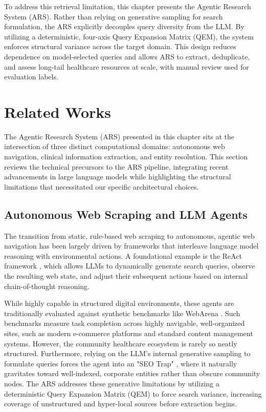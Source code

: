 \documentclass[12pt,oneside]{report}
\begin{document}
To address this retrieval limitation, this chapter presents the Agentic Research System (ARS). Rather than relying on generative sampling for search formulation, the ARS explicitly decouples query diversity from the LLM. By utilizing a deterministic, four-axis Query Expansion Matrix (QEM), the system enforces structural variance across the target domain. This design reduces dependence on model-selected queries and allows ARS to extract, deduplicate, and assess long-tail healthcare resources at scale, with manual review used for evaluation labels.



\section{Related Works}

The Agentic Research System (ARS) presented in this chapter sits at the intersection of three distinct computational domains: autonomous web navigation, clinical information extraction, and entity resolution. This section reviews the technical precursors to the ARS pipeline, integrating recent advancements in large language models while highlighting the structural limitations that necessitated our specific architectural choices.

\subsection{Autonomous Web Scraping and LLM Agents}
The transition from static, rule-based web scraping to autonomous, agentic web navigation has been largely driven by frameworks that interleave language model reasoning with environmental actions. A foundational example is the ReAct framework \cite{15}, which allows LLMs to dynamically generate search queries, observe the resulting web state, and adjust their subsequent actions based on internal chain-of-thought reasoning. 

While highly capable in structured digital environments, these agents are traditionally evaluated against synthetic benchmarks like WebArena \cite{11}. Such benchmarks measure task completion across highly navigable, well-organized sites, such as modern e-commerce platforms and standard content management systems. However, the community healthcare ecosystem is rarely so neatly structured. Furthermore, relying on the LLM's internal generative sampling to formulate queries forces the agent into an "SEO Trap" \cite{24}, where it naturally gravitates toward well-indexed, corporate entities rather than obscure community nodes. The ARS addresses these generative limitations by utilizing a deterministic Query Expansion Matrix (QEM) to force search variance, increasing coverage of unstructured and hyper-local sources before extraction begins.
\end{document}
